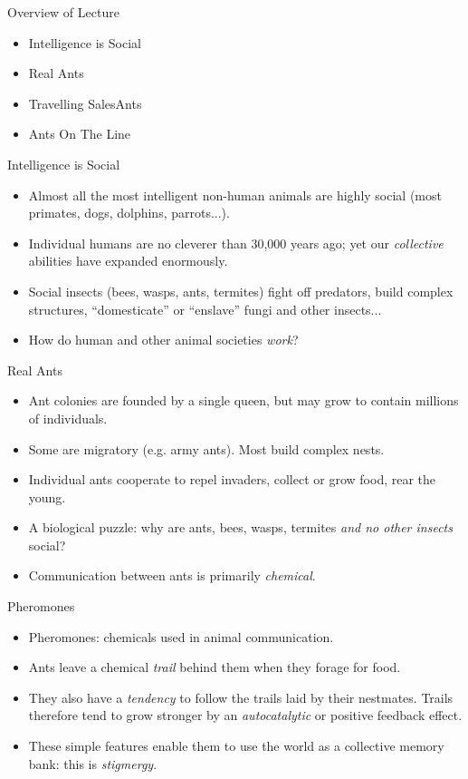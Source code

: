 \documentclass{article}
\begin{document}
\begin{slide}{}
{\Large Overview of Lecture}
\begin{itemize}
\item Intelligence is Social
\item Real Ants
\item Travelling SalesAnts
\item Ants On The Line
\end{itemize}
\end{slide}

\begin{slide}{}
{\Large Intelligence is Social}
\begin{itemize}
\item Almost all the most intelligent non-human animals are highly
social (most primates, dogs, dolphins, parrots...).
\item Individual humans are no cleverer than 30,000 years ago; yet our
{\em collective} abilities have expanded enormously.
\item Social insects (bees, wasps, ants, termites) fight off
predators, build complex
structures, ``domesticate'' or ``enslave'' fungi and other insects...
\item How do human and other animal societies {\em work}?
\end{itemize}
\end{slide}

\begin{slide}{}
{\Large Real Ants}
\begin{itemize}
\item Ant colonies are founded by a single queen, but may grow to
contain millions of individuals.
\item Some are migratory (e.g. army ants). Most build complex nests.
\item Individual ants cooperate to repel invaders, collect or grow food, rear
the young.
\item A biological puzzle: why are ants, bees, wasps, termites {\em
and no other insects} social?
\item Communication between ants is primarily {\em chemical}.
\end{itemize}
\end{slide}

\begin{slide}{}
{\Large Pheromones}
\begin{itemize}
\item Pheromones: chemicals used in animal communication.
\item Ants leave a chemical {\em trail} behind them when
they forage for food.
\item They also have a {\em tendency} to follow the trails laid by their
nestmates. Trails therefore tend to grow stronger by an {\em
autocatalytic} or positive feedback effect.
\item These simple features enable
them to use the world as a collective memory bank: this is {\em stigmergy}.
\end{itemize}
\end{slide}
\end{document}
